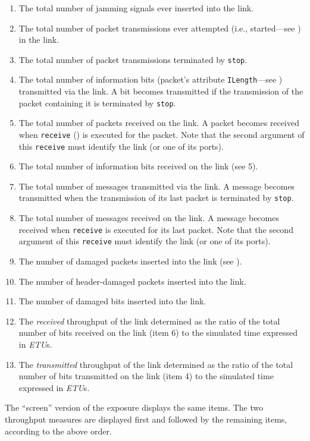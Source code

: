 \begin{enumerate}
\item
The total number of jamming signals ever inserted into the link.
\item
The total number of packet transmissions ever attempted (i.e., started---see
) in the link.
\item
The total number of packet transmissions terminated by {\tt stop}.
\item
The total number of information bits (packet's attribute
{\tt ILength}---see ) transmitted via the link.
A bit becomes transmitted if the transmission of the packet containing it
is terminated by {\tt stop}.
\item
The total number of packets received on the link.
A packet becomes received when {\tt receive} () is executed
for the packet.
Note that the second argument of this {\tt receive} must identify the
link (or one of its ports).
\item
The total number of information bits received on the link (see 5).
\item
The total number of messages transmitted via the link.
A message becomes transmitted when the transmission of its last packet
is terminated by {\tt stop}.
\item
The total number of messages received on the link.
A message becomes received when 
{\tt receive} is executed for its last packet.
Note that the second argument of this {\tt receive} must identify the
link (or one of its ports).
\item
The number of damaged packets inserted into the link (see ).
\item
The number of header-damaged packets inserted into the link.
\item
The number of damaged bits inserted into the link.
\item
The {\em received\/} throughput of the link determined as the ratio of
the total number of bits received on the link (item 6)
to the simulated time expressed in {\em ETU}s.
\item
The {\em transmitted\/} throughput of the link determined as the ratio of
the total number of bits transmitted on the link (item 4)
to the simulated time expressed in {\em ETU}s.
\end{enumerate}

The ``screen'' version of the exposure displays the same items.
The two throughput measures are displayed first and followed by the
remaining items, according to the above order.

